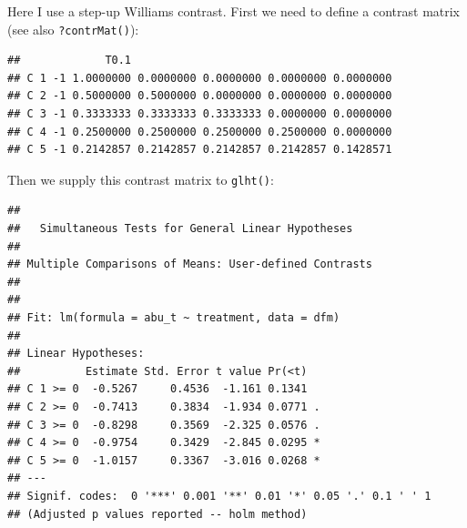 Here I use a step-up Williams contrast.
First we need to define a contrast matrix (see also \texttt{?contrMat()}):

\begin{knitrout}
\color{fgcolor}\small\begin{kframe}
\begin{alltt}
 \hlkwb{<-} \hlopt{$}\hlopt{$}
 \hlkwb{<-} 
 \hlkwb{<-} \hlstd{()}
   \hlopt{:} \hlopt{-} \hlstd{)) \{}
       \hlkwb{<-} \hlstd{(}\hlopt{-}\hlstd{, n[}\hlopt{:} \hlopt{+} \hlstd{)]} \hlopt{/} \hlstd{(n[}\hlopt{:} \hlopt{+} \hlstd{)]),} \hlstd{(}  \hlopt{-}  \hlopt{-} \hlstd{))}
       \hlkwb{<-} 
\hlstd{\}}
 \hlkwb{<-} \hlstd{(}\hlstd{,} \hlopt{:}
\end{alltt}
\begin{verbatim}
##             T0.1                                        
## C 1 -1 1.0000000 0.0000000 0.0000000 0.0000000 0.0000000
## C 2 -1 0.5000000 0.5000000 0.0000000 0.0000000 0.0000000
## C 3 -1 0.3333333 0.3333333 0.3333333 0.0000000 0.0000000
## C 4 -1 0.2500000 0.2500000 0.2500000 0.2500000 0.0000000
## C 5 -1 0.2142857 0.2142857 0.2142857 0.2142857 0.1428571
\end{verbatim}
\end{kframe}
\end{knitrout}

Then we supply this contrast matrix to \texttt{glht()}:
\begin{knitrout}
\color{fgcolor}\small\begin{kframe}
\begin{alltt}
\hlstd{(}  \hlstd{=} \hlstd{(} 
                 \hlstd{=} \hlstd{),}
                 \hlstd{=} \hlstd{(}\hlstd{))}
\end{alltt}
\begin{verbatim}
## 
## 	 Simultaneous Tests for General Linear Hypotheses
## 
## Multiple Comparisons of Means: User-defined Contrasts
## 
## 
## Fit: lm(formula = abu_t ~ treatment, data = dfm)
## 
## Linear Hypotheses:
##          Estimate Std. Error t value Pr(<t)  
## C 1 >= 0  -0.5267     0.4536  -1.161 0.1341  
## C 2 >= 0  -0.7413     0.3834  -1.934 0.0771 .
## C 3 >= 0  -0.8298     0.3569  -2.325 0.0576 .
## C 4 >= 0  -0.9754     0.3429  -2.845 0.0295 *
## C 5 >= 0  -1.0157     0.3367  -3.016 0.0268 *
## ---
## Signif. codes:  0 '***' 0.001 '**' 0.01 '*' 0.05 '.' 0.1 ' ' 1
## (Adjusted p values reported -- holm method)
\end{verbatim}
\end{kframe}
\end{knitrout}


